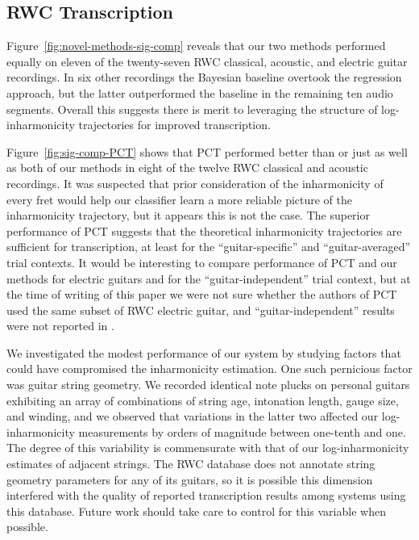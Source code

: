 \documentclass[convention,peer-reviewed]{aesconf}
\begin{document}
\subsection{RWC Transcription}
Figure~\ref{fig:novel-methods-sig-comp} reveals that our two methods performed equally on eleven of the twenty-seven RWC classical, acoustic, and electric guitar recordings. In six other recordings the Bayesian baseline overtook the regression approach, but the latter outperformed the baseline in the remaining ten audio segments. Overall this suggests there is merit to leveraging the structure of log-inharmonicity trajectories for improved transcription.

Figure~\ref{fig:sig-comp-PCT} shows that PCT performed better than or just as well as both of our methods in eight of the twelve RWC classical and acoustic recordings. It was suspected that prior consideration of the inharmonicity of every fret would help our classifier learn a more reliable picture of the inharmonicity trajectory, but it appears this is not the case. The superior performance of PCT suggests that the theoretical inharmonicity trajectories are sufficient for transcription, at least for the ``guitar-specific'' and ``guitar-averaged'' trial contexts. It would be interesting to compare performance of PCT and our methods for electric guitars and for the ``guitar-independent'' trial context, but at the time of writing of this paper we were not sure whether the authors of PCT used the same subset of RWC electric guitar, and ``guitar-independent'' results were not reported in \citet{barbanchoi2012}.

We investigated the modest performance of our system by studying factors that could have compromised the inharmonicity estimation. One such pernicious factor was guitar string geometry. We recorded identical note plucks on personal guitars exhibiting an array of combinations of string age, intonation length, gauge size, and winding, and we observed that variations in the latter two affected our log-inharmonicity measurements by orders of magnitude between one-tenth and one. The degree of this variability is commensurate with that of our log-inharmonicity estimates of adjacent strings. The RWC database does not annotate string geometry parameters for any of its guitars, so it is possible this dimension interfered with the quality of reported transcription results among systems using this database. Future work should take care to control for this variable when possible.
\end{document}
